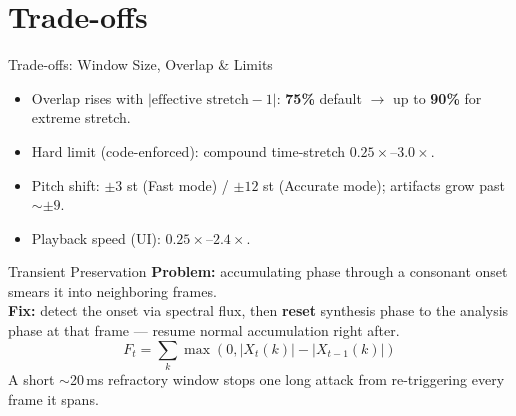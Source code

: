 \documentclass[aspectratio=169]{beamer}
\begin{document}
\section{Trade-offs}
\begin{frame}{Trade-offs: Window Size, Overlap \& Limits}
  \centering
  \vspace{0.4cm}
  \small
  \begin{itemize}
    \item Overlap rises with $|\text{effective stretch}-1|$: \textbf{75\%} default $\to$ up to \textbf{90\%} for extreme stretch.
    \item Hard limit (code-enforced): compound time-stretch $\mathbf{0.25\times}$--$\mathbf{3.0\times}$.
    \item Pitch shift: $\pm3$ st (Fast mode) / $\pm12$ st (Accurate mode); artifacts grow past $\sim\pm9$.
    \item Playback speed (UI): $0.25\times$--$2.4\times$.
  \end{itemize}
\end{frame}

\begin{frame}{Transient Preservation}
  \textbf{Problem:} accumulating phase through a consonant onset smears it into neighboring frames.\\[4pt]
  \textbf{Fix:} detect the onset via spectral flux, then \textbf{reset} synthesis phase to the analysis phase at that frame --- resume normal accumulation right after.\\[6pt]
  \[ F_t=\sum_k\max(0,|X_t(k)|-|X_{t-1}(k)|) \]
  \small A short $\sim$20\,ms refractory window stops one long attack from re-triggering every frame it spans.
\end{frame}
\end{document}
